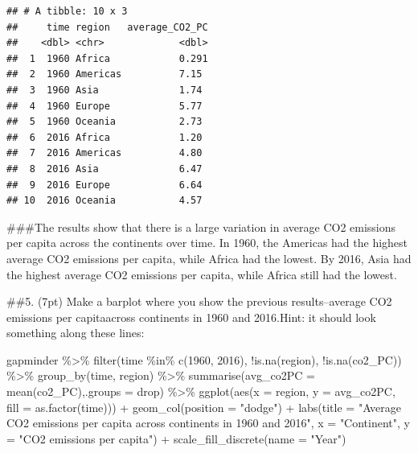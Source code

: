\documentclass[
]{article}
\newenvironment{Shaded}{\begin{snugshade}}{\end{snugshade}}
\newcommand{\AttributeTok}[1]{\textcolor[rgb]{0.77,0.63,0.00}{#1}}
\newcommand{\DecValTok}[1]{\textcolor[rgb]{0.00,0.00,0.81}{#1}}
\newcommand{\FunctionTok}[1]{\textcolor[rgb]{0.00,0.00,0.00}{#1}}
\newcommand{\NormalTok}[1]{#1}
\newcommand{\SpecialCharTok}[1]{\textcolor[rgb]{0.00,0.00,0.00}{#1}}
\newcommand{\StringTok}[1]{\textcolor[rgb]{0.31,0.60,0.02}{#1}}
\begin{document}
\begin{verbatim}
## # A tibble: 10 x 3
##     time region   average_CO2_PC
##    <dbl> <chr>             <dbl>
##  1  1960 Africa            0.291
##  2  1960 Americas          7.15 
##  3  1960 Asia              1.74 
##  4  1960 Europe            5.77 
##  5  1960 Oceania           2.73 
##  6  2016 Africa            1.20 
##  7  2016 Americas          4.80 
##  8  2016 Asia              6.47 
##  9  2016 Europe            6.64 
## 10  2016 Oceania           4.57
\end{verbatim}

\#\#\#The results show that there is a large variation in average CO2
emissions per capita across the continents over time. In 1960, the
Americas had the highest average CO2 emissions per capita, while Africa
had the lowest. By 2016, Asia had the highest average CO2 emissions per
capita, while Africa still had the lowest.

\#\#5. (7pt) Make a barplot where you show the previous results--average
CO2 emissions per capitaacross continents in 1960 and 2016.Hint: it
should look something along these lines:

\begin{Shaded}
\begin{Highlighting}[]
\NormalTok{gapminder }\SpecialCharTok{\%\textgreater{}\%}
  \FunctionTok{filter}\NormalTok{(time }\SpecialCharTok{\%in\%} \FunctionTok{c}\NormalTok{(}\DecValTok{1960}\NormalTok{, }\DecValTok{2016}\NormalTok{), }\SpecialCharTok{!}\FunctionTok{is.na}\NormalTok{(region), }\SpecialCharTok{!}\FunctionTok{is.na}\NormalTok{(co2\_PC)) }\SpecialCharTok{\%\textgreater{}\%}
  \FunctionTok{group\_by}\NormalTok{(time, region) }\SpecialCharTok{\%\textgreater{}\%}
  \FunctionTok{summarise}\NormalTok{(}\AttributeTok{avg\_co2PC =} \FunctionTok{mean}\NormalTok{(co2\_PC),}\AttributeTok{.groups =} \StringTok{\textquotesingle{}drop\textquotesingle{}}\NormalTok{) }\SpecialCharTok{\%\textgreater{}\%}
  \FunctionTok{ggplot}\NormalTok{(}\FunctionTok{aes}\NormalTok{(}\AttributeTok{x =}\NormalTok{ region, }\AttributeTok{y =}\NormalTok{ avg\_co2PC, }\AttributeTok{fill =} \FunctionTok{as.factor}\NormalTok{(time))) }\SpecialCharTok{+} 
  \FunctionTok{geom\_col}\NormalTok{(}\AttributeTok{position =} \StringTok{"dodge"}\NormalTok{) }\SpecialCharTok{+} 
  \FunctionTok{labs}\NormalTok{(}\AttributeTok{title =} \StringTok{"Average CO2 emissions per capita across continents in 1960 and 2016"}\NormalTok{, }\AttributeTok{x =} \StringTok{"Continent"}\NormalTok{, }\AttributeTok{y =} \StringTok{"CO2 emissions per capita"}\NormalTok{) }\SpecialCharTok{+}
  \FunctionTok{scale\_fill\_discrete}\NormalTok{(}\AttributeTok{name =} \StringTok{"Year"}\NormalTok{)}
\end{Highlighting}
\end{Shaded}
\end{document}
